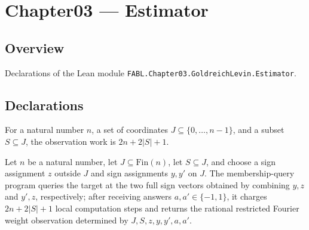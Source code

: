 \chapter{Chapter03 — Estimator}
\section{Overview}

Declarations of the Lean module \texttt{FABL.Chapter03.GoldreichLevin.Estimator}.

\section{Declarations}

\begin{definition}
\label{FABL.restrictedFourierWeightObservationWork}
\leanok
For a natural number $n$, a set of coordinates $J\subseteq\{0,\ldots,n-1\}$, and a
subset $S\subseteq J$, the observation work is $2n+2|S|+1$.
\end{definition}

\begin{definition}
\label{FABL.restrictedFourierWeightObservationProgram}
\leanok
{}
Let $n$ be a natural number, let $J\subseteq\mathrm{Fin}(n)$, let $S\subseteq J$, and
choose a sign assignment $z$ outside $J$ and sign assignments $y,y'$ on $J$. The
membership-query program queries the target at the two full sign vectors obtained by
combining $y,z$ and $y',z$, respectively; after receiving answers $a,a'\in\{−1,1\}$, it
charges $2n+2|S|+1$ local computation steps and returns the rational restricted Fourier
weight observation determined by $J,S,z,y,y',a,a'$.
\end{definition}

